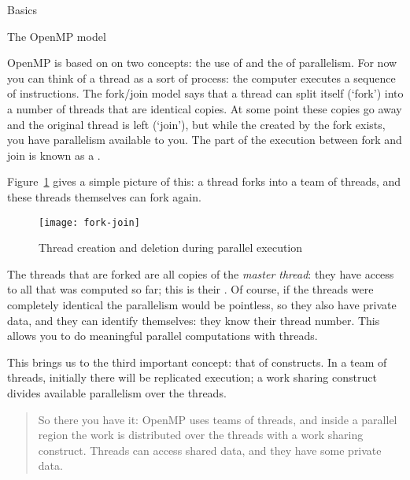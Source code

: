 
 {Basics}

 {The OpenMP model}

OpenMP is based on on two concepts: the use of 
and the  of
parallelism. For now you can think of a thread as a sort of process:
the computer executes a sequence of instructions.
The fork/join model says that a thread can split itself (`fork')
into a number of threads that are identical copies. At some point
these copies go away and the original thread is left (`join'),
but while the  created by the fork exists,
you have parallelism available to you. The part of the execution
between fork and join is known as a .

Figure~\ref{fig:forkjoin} gives a simple picture of this:
a thread forks into a team of threads, and these threads
themselves can fork again.
\begin{figure}[ht]
\texttt{[image: fork-join]}
\caption{Thread creation and deletion during parallel execution}
\label{fig:forkjoin}
\end{figure}

The threads that are forked are all copies of the
\emph{master thread}: they have access to all that was
computed so far; this is their .  Of course, if
the threads were completely identical the parallelism would be
pointless, so they also have private data, and they can identify
themselves: they know their thread number.  This allows you to do
meaningful parallel computations with threads.

This brings us to the third important concept: that of 
constructs. In a team of threads, initially there will be replicated execution;
a work sharing construct divides available parallelism over the threads.

\begin{quote}
  So there you have it: OpenMP uses teams of threads, and inside
  a parallel region the work is distributed over the threads with a work sharing construct.
  Threads can access shared data, and they have some private data.
\end{quote}

